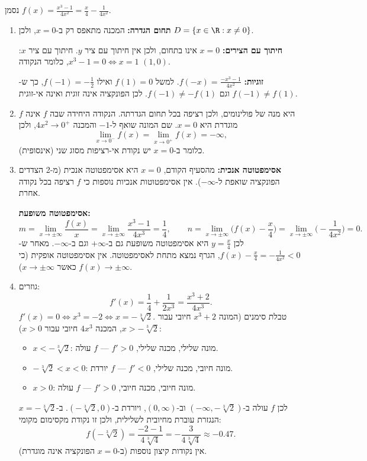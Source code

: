 \begin{solution}
נסמן $f(x)=\frac{x^3-1}{4x^2}=\frac{x}{4}-\frac{1}{4x^2}$.
\begin{enumerate}
  \item \textbf{תחום הגדרה:} המכנה מתאפס רק ב-$x=0$, ולכן $D=\{x\in\R : x\neq 0\}$.

  \textbf{חיתוך עם הצירים:} $x=0$ אינו בתחום, ולכן אין חיתוך עם ציר $y$. חיתוך עם ציר $x$: $x^3-1=0 \iff x=1$, כלומר הנקודה $(1,0)$.

  \textbf{זוגיות:} $f(-x)=\frac{-x^3-1}{4x^2}$. למשל $f(1)=0$ ואילו $f(-1)=-\frac12$, כך ש-$f(-1)\neq f(1)$ וגם $f(-1)\neq -f(1)$. לכן הפונקציה אינה זוגית ואינה אי-זוגית.

  \item $f$ היא מנה של פולינומים, ולכן רציפה בכל תחום הגדרתה. הנקודה היחידה שבה $f$ אינה מוגדרת היא $x=0$. שם המונה שואף ל-$-1$ והמכנה $4x^2\to 0^+$, ולכן
  \[ \lim_{x\to 0^-} f(x)=\lim_{x\to 0^+} f(x)=-\infty , \]
  כלומר ב-$x=0$ יש נקודת אי-רציפות מסוג שני (אינסופית).

  \item \textbf{אסימפטוטה אנכית:} מהסעיף הקודם, $x=0$ היא אסימפטוטה אנכית (מ-2 הצדדים הפונקציה שואפת ל-$-\infty$). אין אסימפטוטות אנכיות נוספות כי $f$ רציפה בכל נקודה אחרת.

  \textbf{אסימפטוטה משופעת:}
  \[ m=\lim_{x\to\pm\infty}\frac{f(x)}{x}=\lim_{x\to\pm\infty}\frac{x^3-1}{4x^3}=\frac14,\qquad
     n=\lim_{x\to\pm\infty}\Big(f(x)-\frac{x}{4}\Big)=\lim_{x\to\pm\infty}\Big(-\frac{1}{4x^2}\Big)=0 . \]
  לכן $y=\frac{x}{4}$ היא אסימפטוטה משופעת גם ב-$+\infty$ וגם ב-$-\infty$. מאחר ש-$f(x)-\frac{x}{4}=-\frac{1}{4x^2}<0$, הגרף נמצא מתחת לאסימפטוטה. אין אסימפטוטה אופקית (כי $f(x)\to\pm\infty$ כאשר $x\to\pm\infty$).

  \item גוזרים:
  \[ f'(x)=\frac14+\frac{1}{2x^3}=\frac{x^3+2}{4x^3}. \]
  $f'(x)=0 \iff x^3=-2 \iff x=-\sqrt[3]{2}$. טבלת סימנים (המונה $x^3+2$ חיובי עבור $x>-\sqrt[3]{2}$, המכנה $4x^3$ חיובי עבור $x>0$):
  \begin{itemize}
    \item $x<-\sqrt[3]{2}$: מונה שלילי, מכנה שלילי, $f'>0$ --- $f$ עולה.
    \item $-\sqrt[3]{2}<x<0$: מונה חיובי, מכנה שלילי, $f'<0$ --- $f$ יורדת.
    \item $x>0$: מונה חיובי, מכנה חיובי, $f'>0$ --- $f$ עולה.
  \end{itemize}
  לכן $f$ עולה ב-$(-\infty,-\sqrt[3]{2})$ וב-$(0,\infty)$, ויורדת ב-$(-\sqrt[3]{2},0)$.
  ב-$x=-\sqrt[3]{2}$ הנגזרת עוברת מחיובית לשלילית, ולכן זו נקודת מקסימום מקומי:
  \[ f(-\sqrt[3]{2})=\frac{-2-1}{4\sqrt[3]{4}}=-\frac{3}{4\sqrt[3]{4}}\approx -0.47 . \]
  אין נקודות קיצון נוספות (ב-$x=0$ הפונקציה אינה מוגדרת).


\end{enumerate}
\end{solution}
